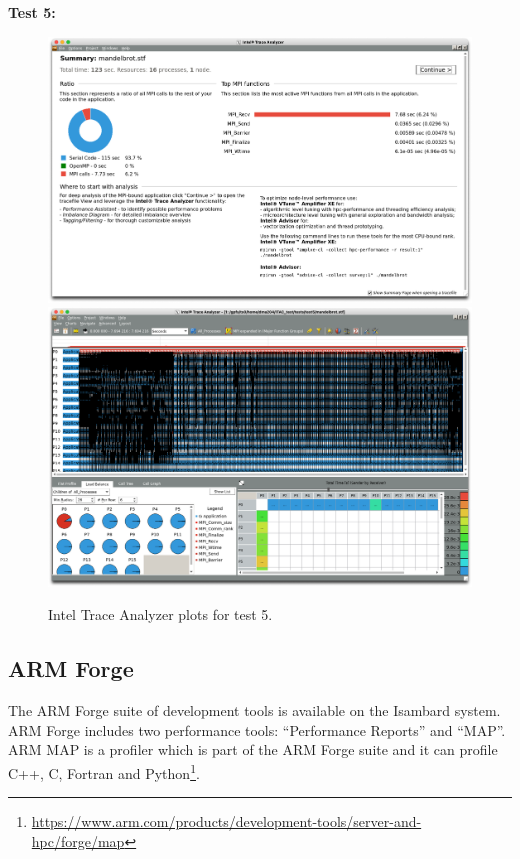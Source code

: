 \documentclass[a4paper,titlepage]{article}
\begin{document}
\noindent
\textbf{Test 5:}  
\begin{figure}[htbp]
\begin{center}
\includegraphics[scale=0.3]{figures/test5_summary}
\includegraphics[scale=0.3]{figures/test5_eventTimeline}
\caption{Intel Trace Analyzer plots for test 5.}
\label{fig:test5_ITAC_summary}
\end{center}
\end{figure}


\subsection{ARM Forge}

The ARM Forge suite of development tools is available on the Isambard system. ARM Forge includes two performance tools: ``Performance Reports'' and ``MAP''. 
ARM MAP is a profiler which is part of the ARM Forge suite and it can profile C++, C, Fortran and Python\footnote{\url{https://www.arm.com/products/development-tools/server-and-hpc/forge/map}}.
\end{document}
